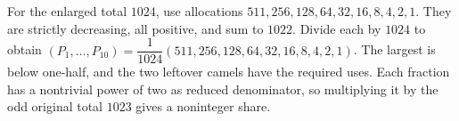 For the enlarged total $1024$, use allocations $511,256,128,64,32,16,8,4,2,1$. They are strictly decreasing, all positive, and sum to $1022$. Divide each by $1024$ to obtain $\boxed{(P_1,\ldots,P_{10})=\dfrac{1}{1024}(511,256,128,64,32,16,8,4,2,1)}$. The largest is below one-half, and the two leftover camels have the required uses. Each fraction has a nontrivial power of two as reduced denominator, so multiplying it by the odd original total $1023$ gives a noninteger share.
